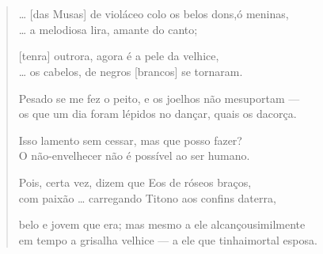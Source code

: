 \section*{}
\begin{verse}
\ldots{} [das Musas] de violáceo colo os belos dons,\qb{}ó meninas,\\
\ldots{} a melodiosa lira, amante do canto;\\

\medskip

[tenra] outrora, agora é a pele da velhice,\\
\ldots{} os cabelos, de negros [brancos] se tornaram.\\

\medskip

Pesado se me fez o peito, e os joelhos não me\qb{}suportam --- \\
os que um dia foram lépidos no dançar, quais os da\qb{}corça.\\

\medskip

Isso lamento sem cessar, mas que posso fazer?\\
O não-envelhecer não é possível ao ser humano.\\

\medskip

Pois, certa vez, dizem que Eos de róseos braços,\\
com paixão \ldots{} carregando Titono aos confins da\qb{}terra,\\

\medskip

belo e jovem que era; mas mesmo a ele alcançou\qb{}similmente\\
em tempo a grisalha velhice --- a ele que tinha\qb{}imortal esposa.
\end{verse}

\medskip

